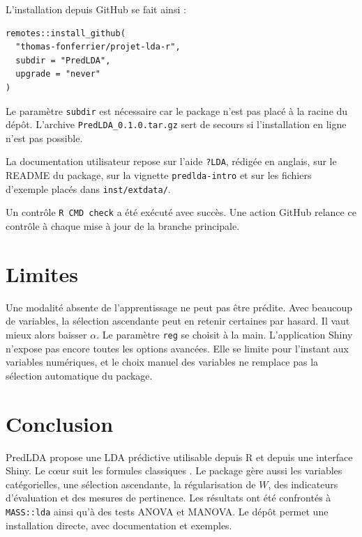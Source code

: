 \documentclass[11pt,a4paper]{article}
\begin{document}
L'installation depuis GitHub se fait ainsi :
\begin{lstlisting}
remotes::install_github(
  "thomas-fonferrier/projet-lda-r",
  subdir = "PredLDA",
  upgrade = "never"
)
\end{lstlisting}

Le param\`etre \texttt{subdir} est n\'ecessaire car le package n'est pas plac\'e
\`a la racine du d\'ep\^ot. L'archive \texttt{PredLDA\_0.1.0.tar.gz} sert de
secours si l'installation en ligne n'est pas possible.

La documentation utilisateur repose sur l'aide \texttt{?LDA}, r\'edig\'ee en
anglais, sur le README du package, sur la vignette \texttt{predlda-intro} et
sur les fichiers d'exemple plac\'es dans \texttt{inst/extdata/}.

Un contr\^ole \texttt{R CMD check} a \'et\'e ex\'ecut\'e avec succ\`es. Une
action GitHub relance ce contr\^ole \`a chaque mise \`a jour de la branche
principale.

\section{Limites}

Une modalit\'e absente de l'apprentissage ne peut pas \^etre pr\'edite. Avec
beaucoup de variables, la s\'election ascendante peut en retenir certaines par
hasard. Il vaut mieux alors baisser \(\alpha\). Le param\`etre \texttt{reg} se
choisit \`a la main. L'application Shiny n'expose pas encore toutes les
options avanc\'ees. Elle se limite pour l'instant aux variables num\'eriques,
et le choix manuel des variables ne remplace pas la s\'election automatique
du package.

\section{Conclusion}

PredLDA propose une LDA pr\'edictive utilisable depuis R et depuis une
interface Shiny. Le c\oe ur suit les formules classiques \cite{hastie2009esl}.
Le package g\`ere aussi les variables cat\'egorielles, une s\'election
ascendante, la r\'egularisation de \(W\), des indicateurs d'\'evaluation et des
mesures de pertinence. Les r\'esultats ont \'et\'e confront\'es \`a
\texttt{MASS::lda} ainsi qu'\`a des tests ANOVA et MANOVA. Le d\'ep\^ot permet
une installation directe, avec documentation et exemples.



\end{document}
